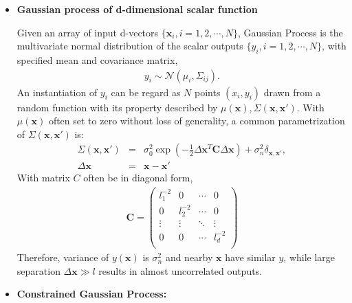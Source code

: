 \documentclass[aps,prl,twocolumn,groupedaddress]{revtex4-1}
\begin{document}
	 \begin{itemize}
	 \item {\bf Gaussian process of d-dimensional scalar function}
	 
	 Given an array of input d-vectors $\{\mathbf{x}_i, i = 1, 2, \cdots, N\}$, Gaussian Process is the multivariate normal distribution of the scalar outputs $\{y_i, i = 1, 2, \cdots, N\}$,  with specified mean and covariance matrix,
	 \begin{eqnarray}
	 y_i \sim \mathcal{N}(\mu_i, \Sigma_{ij}).
	 \end{eqnarray}
An instantiation of $y_i$ can be regard as $N$ points $(x_i, y_i)$ drawn from a random function with its property described by $\mu(\mathbf{x}), \Sigma(\mathbf{x}, \mathbf{x}')$. 
	With $\mu(\mathbf{x})$ often set to zero without loss of generality, a common parametrization of $\Sigma(\mathbf{x}, \mathbf{x}')$ is:
	\begin{eqnarray}\label{kernel}
		\Sigma(\mathbf{x}, \mathbf{x}') &=& \sigma_0^2\exp\left( -\frac{1}{2}\Delta\mathbf{x}^T \mathbf{C} \Delta\mathbf{x} \right) + \sigma_n^2\delta_{\mathbf{x}, \mathbf{x}'}, \\
		\Delta\mathbf{x} &=& \mathbf{x} - \mathbf{x}'	
	\end{eqnarray}
	With  matrix $C$ often be in diagonal form,
	\begin{eqnarray}
		\mathbf{C} = 
		\left(		
		\begin{array}{cccc}
			l_1^{-2} 	& 	0 		&	 \cdots & 0	\\
			0 			& l_2^{-2}	 & 		\cdots & 0	\\
			\vdots 			& \vdots & \ddots & \vdots	\\
			0 			& 		0 & \cdots & l_d^{-2} \\
		\end{array}
		\right)
	\end{eqnarray}
	Therefore, variance of $y(\mathbf{x})$ is $\sigma_n^2$ and nearby $\mathbf{x}$ have similar $y$, while large separation $\Delta \mathbf{x} \gg l$ results in almost uncorrelated outputs.
	 
	 
	 \item {\bf Constrained Gaussian Process:}
	 

\end{itemize}
\end{document}

